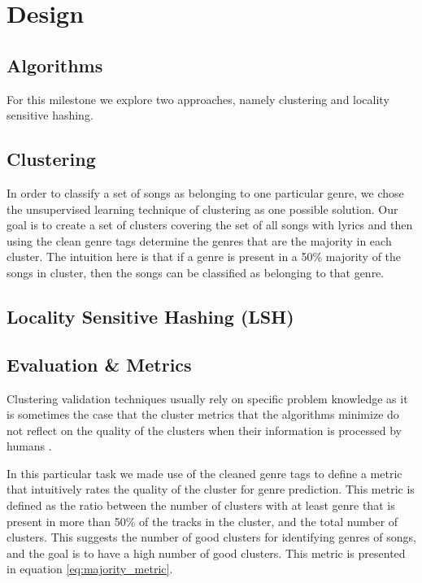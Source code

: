 \documentclass[10pt,a4paper]{scrartcl}
\begin{document}
  \section{Design}  
    \subsection{Algorithms}
      For this milestone we explore two approaches, namely clustering and
      locality sensitive hashing.
      \subsection{Clustering}
        In order to classify a set of songs as belonging to one particular
        genre, we chose the unsupervised learning technique of clustering
        as one possible solution.
        Our goal is to create a set of clusters covering the set of all songs
        with lyrics and then using the clean genre tags determine the genres
        that are the majority in each cluster.   
        The intuition here is that if a genre is present in a 50\% majority
        of the songs in cluster, then the songs can be classified as belonging
        to that genre.
      \subsection{Locality Sensitive Hashing (LSH)}
    \subsection{Evaluation \& Metrics}
      Clustering validation techniques usually rely on specific problem
      knowledge as it is sometimes the case that the cluster metrics
      that the algorithms minimize do not reflect on the quality of the
      clusters when their information is processed by humans
      \cite{halkidi2001clustering}. 
      
      In this particular task we made use of the cleaned genre tags to define a
      metric that intuitively rates the quality of the cluster for genre       
      prediction. This metric is defined as the ratio between the number of
      clusters with at least genre that is present in more than 50\% of the
      tracks in the cluster, and the total number of clusters. This
      suggests the number of good clusters for identifying genres of
      songs, and the goal is to have a high number of good clusters.
      This metric is presented in equation \ref{eq:majority_metric}.
      
\end{document}
